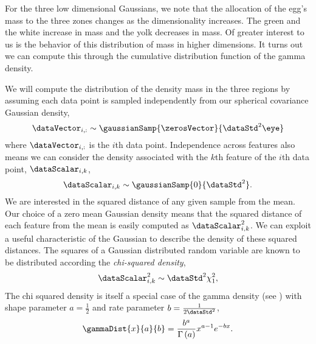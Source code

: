 For the three low dimensional Gaussians, we note that the allocation
of the egg's mass to the three zones changes as the dimensionality
increases. The green and the white increase in mass and the yolk
decreases in mass. Of greater interest to us is the behavior of this
distribution of mass in higher dimensions. It turns out we can compute
this through the cumulative distribution function of the gamma
density. 

We will compute the distribution of the density mass in the three
regions by assuming each data point is sampled independently from our
spherical covariance Gaussian density,
\[
\dataVector_{i, :} \sim \gaussianSamp{\zerosVector}{\dataStd^2\eye}
\]
where $\dataVector_{i, :}$ is the $i$th data point. Independence
across features also means we can consider the density associated with
the $k$th feature of the $i$th data point, $\dataScalar_{i,k}$,
\[
\dataScalar_{i,k}\sim\gaussianSamp{0}{\dataStd^{2}}.
\]
We are interested in the squared distance of any given sample from the
mean. Our choice of a zero mean Gaussian density means that the
squared distance of each feature from the mean is easily computed as
$\dataScalar_{i,k}^2$. We can exploit a useful characteristic of the
Gaussian to describe the density of these squared distances. The
squares of a Gaussian distributed random variable are known to be
distributed according the \emph{chi-squared density},
\[
\dataScalar_{i,k}^{2}\sim\dataStd^{2}\chi_{1}^{2},
\]
The chi squared density is itself a special case of the gamma
density (see ) with shape
parameter $a=\frac{1}{2}$ and rate parameter
$b=\frac{1}{2\dataStd^{2}}$,
\[
\gammaDist{x}{a}{b}=\frac{b^{a}}{\Gamma\left(a\right)}x^{a-1}e^{-bx}.
\] 


